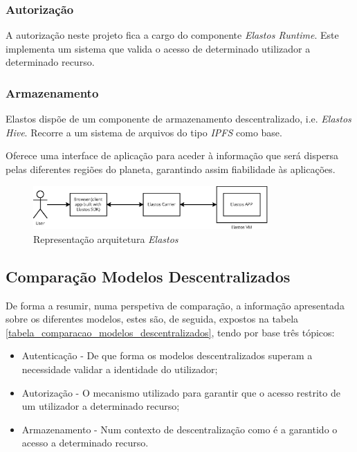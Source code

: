 \subsubsection{Autorização}
A autorização neste projeto fica a cargo do componente \emph{Elastos Runtime}. Este implementa um sistema que valida o acesso de determinado utilizador a determinado recurso\cite{elastos_white_paper}.

\subsubsection{Armazenamento}
Elastos dispõe de um componente de armazenamento descentralizado, i.e. \emph{Elastos Hive}. Recorre a um sistema de arquivos do tipo \emph{\acrfull{IPFS}}\cite{ipfs} como base. 

Oferece uma interface de aplicação para aceder à informação que será dispersa pelas diferentes regiões do planeta, garantindo assim fiabilidade às aplicações.\cite{elastos_white_paper}

\begin{figure}[H]
    \includegraphics[width=0.8\textwidth]{figures/estado_arte-Elastos.eps}
    \caption{Representação arquitetura \emph{Elastos}}
    \label{estado_arte_representacao_elastos}
\end{figure}

\subsection{Comparação Modelos Descentralizados}

De forma a resumir, numa perspetiva de comparação, a informação apresentada sobre os diferentes modelos, estes são, de seguida, expostos na  tabela \ref{tabela_comparacao_modelos_descentralizados}, tendo por base três tópicos:
\begin{itemize}
    \item Autenticação - De que forma os modelos descentralizados superam a necessidade validar a identidade do utilizador;
    \item Autorização - O mecanismo utilizado para garantir que o acesso restrito de um utilizador a determinado recurso;
    \item Armazenamento - Num contexto de descentralização como é a garantido o acesso a determinado recurso.
\end{itemize}

